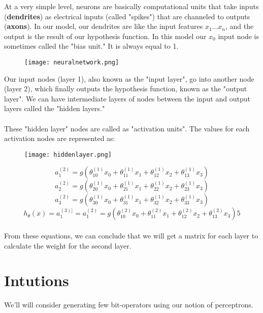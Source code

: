   At a very simple level, neurons are basically computational units that take inputs (\textbf{dendrites}) as electrical inputs (called "spikes") that are channeled to outputs (\textbf{axons}). In our model, our dendrites are like the input features $x_1...x_n$, and the output is the result of our hypothesis function. In this model our $x_0$ input node is sometimes called the "bias unit." It is always equal to 1.

  \begin{figure}[h]
    \centering
    \texttt{[image: neuralnetwork.png]}
  \end{figure}

  Our input nodes (layer 1), also known as the "input layer", go into another node (layer 2), which finally outputs the hypothesis function, known as the "output layer". We can have intermediate layers of nodes between the input and output layers called the "hidden layers."
  \\\\
  These "hidden layer" nodes are called as "activation units". The values for each activation nodes are represented as: \\
  \begin{figure}[h]
    \centering
    \texttt{[image: hiddenlayer.png]}
  \end{figure}

  \begin{equation}
    a_1^{(2)} = g(\theta_{10}^{(1)}x_0 + \theta_{11}^{(1)}x_1 + \theta_{12}^{(1)}x_2 + \theta_{13}^{(1)}x_3)
  \end{equation}
  \begin{equation}
    a_2^{(2)} = g(\theta_{20}^{(1)}x_0 + \theta_{21}^{(1)}x_1 + \theta_{22}^{(1)}x_2 + \theta_{23}^{(1)}x_3)
  \end{equation}
  \begin{equation}
    a_3^{(2)} = g(\theta_{30}^{(1)}x_0 + \theta_{31}^{(1)}x_1 + \theta_{32}^{(1)}x_2 + \theta_{33}^{(1)}x_3)
  \end{equation}
  \begin{equation}
    h_\theta(x) = a_1^{(3)]} = a_1^{(2)} = g(\theta_{10}^{(2)}x_0 + \theta_{11}^{(2)}x_1 + \theta_{12}^{(2)}x_2 + \theta_{13}^{(2)}x_3)5
  \end{equation}
  \\From these equations, we can conclude that we will get a matrix for each layer to calculate the weight for the second layer.

  \section{Intutions}
    We'll will consider generating few bit-operators using our notion of perceptrons.
